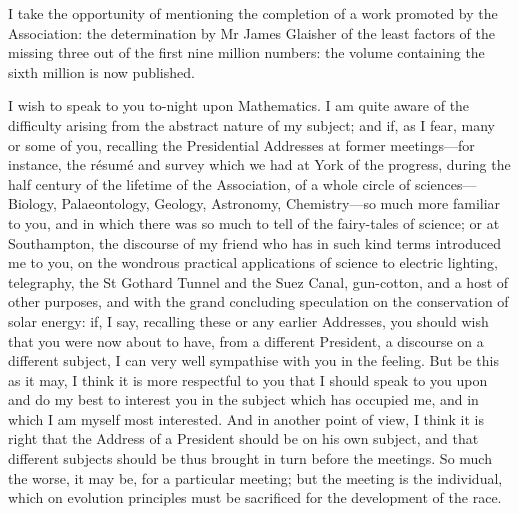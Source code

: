 \documentclass[11pt,a4paper]{article}
\begin{document}
I take the opportunity of mentioning the completion of a work promoted
by the Association: the determination by Mr James Glaisher of the least
factors of the missing three out of the first nine million numbers: the
volume containing the sixth million is now published.

I wish to speak to you to-night upon Mathematics. I am quite aware of
the difficulty arising from the abstract nature of my subject; and if, as
I fear, many or some of you, recalling the Presidential Addresses at
former meetings---for instance, the r\'{e}sum\'{e} and survey which we had
at York of the progress, during the half century of the lifetime of the
Association, of a whole circle of sciences---Biology, Palaeontology,
Geology, Astronomy, Chemistry---so much more familiar to you, and in
which there was so much to tell of the fairy-tales of science; or at
Southampton, the discourse of my friend who has in such kind terms
introduced me to you, on the wondrous practical applications of science
to electric lighting, telegraphy, the St Gothard Tunnel and the Suez
Canal, gun-cotton, and a host of other purposes, and with the grand
concluding speculation on the conservation of solar energy: if, I say,
recalling these or any earlier Addresses, you should wish that you were
now about to have, from a different President, a discourse on a different
subject, I can very well sympathise with you in the feeling. But be this
as it may, I think it is more respectful to you that I should speak to
you upon and do my best to interest you in the subject which has
occupied me, and in which I am myself most interested. And in another
point of view, I think it is right that the Address of a President
should be on his own subject, and that different subjects should be thus
brought in turn before the meetings. So much the worse, it may be, for a
particular meeting; but the meeting is the individual, which on
evolution principles must be sacrificed for the development of the race.
\end{document}
